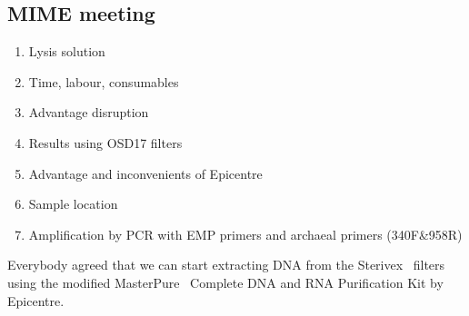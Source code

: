 \subsection{MIME meeting}
\label{task:20180205_cj0}

\begin{enumerate}
\item Lysis solution
\item Time, labour, consumables
\item Advantage disruption
\item Results using OSD17 filters
\item Advantage and inconvenients of Epicentre
\item Sample location
\item Amplification by PCR with EMP primers and archaeal primers (340F\&958R)
\end{enumerate}

Everybody agreed that we can start extracting DNA from the Sterivex\texttrademark~ filters using the modified MasterPure\texttrademark~ Complete DNA and RNA Purification Kit by Epicentre.
